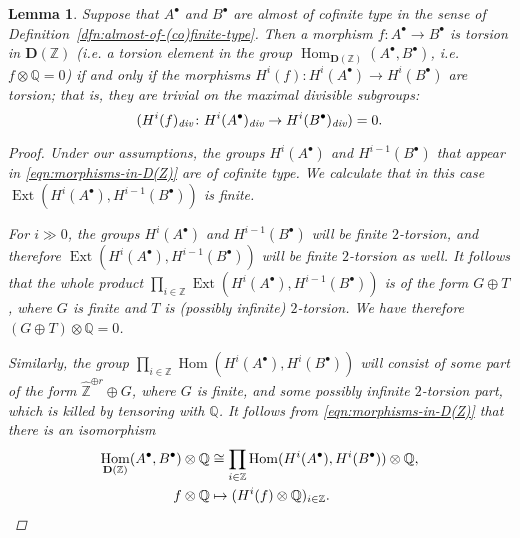 \documentclass[leqno,12pt]{article}
\theoremstyle{plain}
\newtheorem{lemma}[theorem]{\indent\sc Lemma}
\theoremstyle{definition}
\DeclareMathOperator{\Hom}{Hom}
\DeclareMathOperator{\Ext}{Ext}
\newcommand{\QQ}{\mathbb{Q}}
\newcommand{\ZZ}{\mathbb{Z}}
\renewcommand{\div}{\text{\it div}}
\newcommand{\DZ}{{\mathbf{D} (\ZZ)}}
\begin{document}
\begin{lemma}
  \label{lemma:torsion-morphisms-in-D(Z)}
  Suppose that $A^\bullet$ and $B^\bullet$ are almost of cofinite type in the
  sense of Definition~{\rm\ref{dfn:almost-of-(co)finite-type}}. Then a morphism
  $f\colon A^\bullet\to B^\bullet$ is torsion in $\DZ$
  (i.e. a torsion element in the group
  $\Hom_\DZ (A^\bullet, B^\bullet)$, i.e.
  $f\otimes \mathbb{Q} = 0$) if and only if the morphisms
  $H^i (f)\colon H^i (A^\bullet) \to H^i (B^\bullet)$
  are torsion; that is, they are trivial on the maximal divisible subgroups:
  $$(H^i (f)_\div\colon H^i (A^\bullet)_\div \to H^i (B^\bullet)_\div) = 0.$$

  \begin{proof}
    Under our assumptions, the groups $H^i (A^\bullet)$ and
    $H^{i-1} (B^\bullet)$ that appear in \eqref{eqn:morphisms-in-D(Z)} are of
    cofinite type. We calculate that in this case
    $\Ext (H^i (A^\bullet), H^{i-1} (B^\bullet))$ is finite.

    For $i \gg 0$, the groups $H^i (A^\bullet)$ and $H^{i-1} (B^\bullet)$ will
    be finite $2$-torsion, and therefore
    $\Ext (H^i (A^\bullet), H^{i-1} (B^\bullet))$ will be finite
    $2$-torsion as well. It follows that the whole product
    $\prod_{i\in \mathbb{Z}} \Ext (H^i (A^\bullet), H^{i-1} (B^\bullet))$
    is of the form $G \oplus T$, where $G$ is finite and $T$ is
    (possibly infinite) $2$-torsion. We have therefore
    $(G \oplus T)\otimes \QQ = 0$.

    Similarly, the group
    $\prod_{i\in\ZZ} \Hom (H^i (A^\bullet), H^i (B^\bullet))$ will consist of
    some part of the form $\widehat{\ZZ}^{\oplus r} \oplus G$, where $G$ is
    finite, and some possibly infinite $2$-torsion part, which is killed by tensoring with
    $\QQ$. It follows from \eqref{eqn:morphisms-in-D(Z)} that there is an
    isomorphism
    \begin{align*}
      \Hom_\DZ (A^\bullet, B^\bullet)\otimes \mathbb{Q} & \cong
      \prod_{i\in \mathbb{Z}} \Hom (H^i (A^\bullet), H^i (B^\bullet)) \otimes \mathbb{Q}, \\
      f\otimes\QQ & \mapsto (H^i (f) \otimes \QQ)_{i\in\ZZ}. \qedhere
    \end{align*}
  \end{proof}
\end{lemma}
\end{document}
